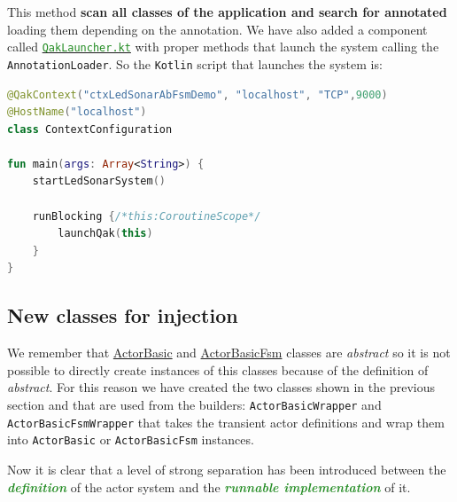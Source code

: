 This method \textbf{scan all classes of the application and search for annotated} loading them depending on the annotation. We have also added a component called \href{https://github.com/LM-96/QA-Extensions/blob/main/it.unibo.qakactor/src/main/kotlin/QakLauncher.kt}{\textcolor{ForestGreen}{\texttt{QakLauncher.kt}}} with proper methods that launch the system calling the \texttt{AnnotationLoader}. So the \texttt{Kotlin} script that launches the system is:

\begin{lstlisting}[caption=\texttt{App.kt} (\texttt{ledsonarsystem0}), language=Kotlin]
@QakContext("ctxLedSonarAbFsmDemo", "localhost", "TCP",9000)
@HostName("localhost")
class ContextConfiguration

fun main(args: Array<String>) {
	startLedSonarSystem()
	
	runBlocking {/*this:CoroutineScope*/
		launchQak(this)
	}
}
\end{lstlisting}

\subsection{New classes for injection}

We remember that \href{https://github.com/anatali/issLab2021/blob/main/it.unibo.qakactor/src/main/kotlin/ActorBasic.kt}{ActorBasic} and \href{https://github.com/anatali/issLab2021/blob/main/it.unibo.qakactor/src/main/kotlin/ActorBasicFsm.kt}{ActorBasicFsm} classes are \textit{abstract} so it is not possible to directly create instances of this classes because of the definition of \textit{abstract}.
For this reason we have created the two classes shown in the previous section and that are used from the builders: \texttt{ActorBasicWrapper} and \texttt{ActorBasicFsmWrapper} that takes the transient actor definitions and wrap them into \texttt{ActorBasic} or \texttt{ActorBasicFsm} instances.

Now it is clear that a level of strong separation has been introduced between the \textcolor{ForestGreen}{\textbf{\textit{definition}}} of the actor system and the \textcolor{ForestGreen}{\textbf{\textit{runnable implementation}}} of it.
